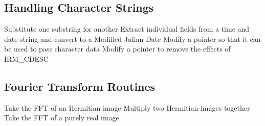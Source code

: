 \subsection {Handling Character Strings}
  {Substitute one substring for another}
  {Extract individual fields from a time and date string and convert 
   to a Modified Julian Date}
  {Modify a pointer so that it can be used to pass character data}
  {Modify a pointer to remove the effects of IRM\_CDESC}


\subsection {Fourier Transform Routines}
  {Take the FFT of an Hermitian image}
  {Multiply two Hermitian images together}
  {Take the FFT of a purely real image}

